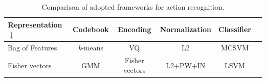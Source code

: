 \begin{table}[h!]
\caption{Comparison of adopted frameworks for action recognition.}
\begin{center}
{
\begin{tabular}{ l| c c c c c }
\hline
Representation $\downarrow$ & Codebook & Encoding & Normalization & Classifier \\
\hline
Bag of Features & \textit{k}-means & VQ & L2 & MCSVM \\
Fisher vectors & GMM & Fisher vectors & L2+PW+IN & LSVM \\
\hline
\end{tabular}
}
\end{center}
\label{tab:frameworks}
\end{table}


